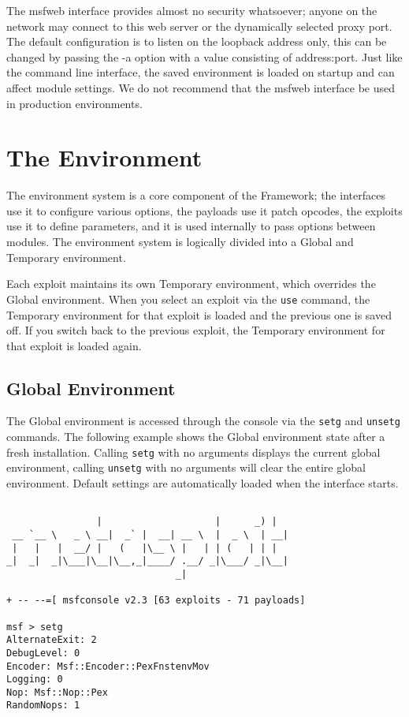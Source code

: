 \documentclass{report}
\begin{document}
\par
The msfweb interface provides almost no security whatsoever; anyone on the
network may connect to this web server or the dynamically selected proxy port.
The default configuration is to listen on the loopback address only, this can be
changed by passing the -a option with a value consisting of address:port. Just
like the command line interface, the saved environment is loaded on startup and
can affect module settings. We do not recommend that the msfweb interface be
used in production environments. 

\pagebreak



\chapter{The Environment}

\par
The environment system is a core component of the Framework; the interfaces use
it to configure various options, the payloads use it patch opcodes, the exploits
use it to define parameters, and it is used internally to pass options between
modules. The environment system is logically divided into a Global and Temporary environment.  

\par
Each exploit maintains its own Temporary environment, which overrides the Global
environment. When you select an exploit via the \texttt{use} command, the
Temporary environment for that exploit is loaded and the previous one is saved
off. If you switch back to the previous exploit, the Temporary environment for
that exploit is loaded again.   

    \section{Global Environment}
    \label{ENV-GLOBAL}
\par
The Global environment is accessed through the console via the \texttt{setg} and
\texttt{unsetg} commands. The following example shows the Global environment
state after a fresh installation. Calling \texttt{setg} with no arguments
displays the current global environment, calling \texttt{unsetg} with no
arguments will clear the entire global environment. Default settings are
automatically loaded when the interface starts.


\begin{verbatim}

                |                    |      _) |
 __ `__ \   _ \ __|  _` |  __| __ \  |  _ \  | __|
 |   |   |  __/ |   (   |\__ \ |   | | (   | | |
_|  _|  _|\___|\__|\__,_|____/ .__/ _|\___/ _|\__|
                              _|

+ -- --=[ msfconsole v2.3 [63 exploits - 71 payloads]

msf > setg
AlternateExit: 2
DebugLevel: 0
Encoder: Msf::Encoder::PexFnstenvMov
Logging: 0
Nop: Msf::Nop::Pex
RandomNops: 1
\end{verbatim}
\end{document}
